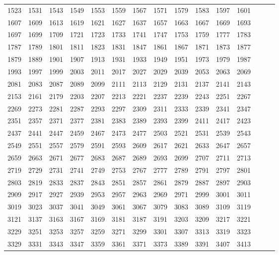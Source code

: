 \documentclass[10pt, a4paper]{article}
\begin{document}
\begin{center}
\begin{longtable}{c c c c c c c c c c c c c c c}
        1523 & 1531 & 1543 & 1549 & 1553 & 1559 & 1567 & 1571 & 1579 & 1583 & 1597 & 1601 \\
        1607 & 1609 & 1613 & 1619 & 1621 & 1627 & 1637 & 1657 & 1663 & 1667 & 1669 & 1693 \\
        1697 & 1699 & 1709 & 1721 & 1723 & 1733 & 1741 & 1747 & 1753 & 1759 & 1777 & 1783 \\
        1787 & 1789 & 1801 & 1811 & 1823 & 1831 & 1847 & 1861 & 1867 & 1871 & 1873 & 1877 \\
        1879 & 1889 & 1901 & 1907 & 1913 & 1931 & 1933 & 1949 & 1951 & 1973 & 1979 & 1987 \\
        1993 & 1997 & 1999 & 2003 & 2011 & 2017 & 2027 & 2029 & 2039 & 2053 & 2063 & 2069 \\
        2081 & 2083 & 2087 & 2089 & 2099 & 2111 & 2113 & 2129 & 2131 & 2137 & 2141 & 2143 \\
        2153 & 2161 & 2179 & 2203 & 2207 & 2213 & 2221 & 2237 & 2239 & 2243 & 2251 & 2267 \\
        2269 & 2273 & 2281 & 2287 & 2293 & 2297 & 2309 & 2311 & 2333 & 2339 & 2341 & 2347 \\
        2351 & 2357 & 2371 & 2377 & 2381 & 2383 & 2389 & 2393 & 2399 & 2411 & 2417 & 2423 \\
        2437 & 2441 & 2447 & 2459 & 2467 & 2473 & 2477 & 2503 & 2521 & 2531 & 2539 & 2543 \\
        2549 & 2551 & 2557 & 2579 & 2591 & 2593 & 2609 & 2617 & 2621 & 2633 & 2647 & 2657 \\
        2659 & 2663 & 2671 & 2677 & 2683 & 2687 & 2689 & 2693 & 2699 & 2707 & 2711 & 2713 \\
        2719 & 2729 & 2731 & 2741 & 2749 & 2753 & 2767 & 2777 & 2789 & 2791 & 2797 & 2801 \\
        2803 & 2819 & 2833 & 2837 & 2843 & 2851 & 2857 & 2861 & 2879 & 2887 & 2897 & 2903 \\
        2909 & 2917 & 2927 & 2939 & 2953 & 2957 & 2963 & 2969 & 2971 & 2999 & 3001 & 3011 \\
        3019 & 3023 & 3037 & 3041 & 3049 & 3061 & 3067 & 3079 & 3083 & 3089 & 3109 & 3119 \\
        3121 & 3137 & 3163 & 3167 & 3169 & 3181 & 3187 & 3191 & 3203 & 3209 & 3217 & 3221 \\
        3229 & 3251 & 3253 & 3257 & 3259 & 3271 & 3299 & 3301 & 3307 & 3313 & 3319 & 3323 \\
        3329 & 3331 & 3343 & 3347 & 3359 & 3361 & 3371 & 3373 & 3389 & 3391 & 3407 & 3413 \\

\end{longtable}
\end{center}
\end{document}
